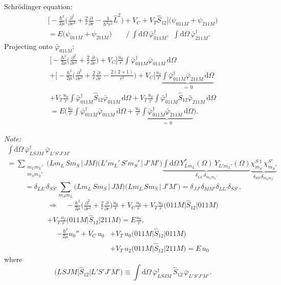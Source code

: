 \documentclass[11pt,a4paper]{article}
\newcommand{\op}[1]{\hat{#1}}
\newcommand{\ud}{\mathrm{d}}
\begin{document}
Schr\"odinger equation:
\begin{multline*}
\Big[-\frac{\hbar^2}{2\mu}\Big(\frac{\partial^2}{\partial r^2}+\frac2r\frac{\partial}{\partial r}
-\frac{1}{\hbar^2r^2}\op L^2\Big)+V_C+V_T\op S_{12}\Big]\big(\psi_{011M}+\psi_{211M}\big)\\
=E\big(\psi_{011M}+\psi_{211M}\big)
\qquad\Big/\ \int\!\ud\Omega\,\bar\varphi^\dagger_{011M},\ \ \int\!\ud\Omega\,\bar\varphi^\dagger_{211M}.
\end{multline*}
Projecting onto $\bar\varphi_{011M}$:
\begin{multline*}
\Big[-\frac{\hbar^2}{2\mu}\Big(\frac{\partial^2}{\partial r^2}+\frac2r\frac{\partial}{\partial r}\Big)+V_C\Big]
\frac{u_0}{r}\int\bar\varphi^\dagger_{011M}\bar\varphi_{011M}\,\ud\Omega\\
+\Big[-\frac{\hbar^2}{2\mu}\Big(\frac{\partial^2}{\partial r^2}+\frac2r\frac{\partial}{\partial r}
-\frac{2(2+1)}{r^2}\Big)+V_C\Big]\frac{u_2}{r}
\underbrace{\int\bar\varphi^\dagger_{011M}\bar\varphi_{211M}\,\ud\Omega}_{=\,0}\\
+V_T\frac{u_0}{r}\int\bar\varphi^\dagger_{011M}\op S_{12}\bar\varphi_{011M}\,\ud\Omega
+V_T\frac{u_2}{r}\int\bar\varphi^\dagger_{011M}\op S_{12}\bar\varphi_{211M}\,\ud\Omega\\
=E\Big(\frac{u_0}{r}\int\bar\varphi^\dagger_{011M}\bar\varphi_{011M}\,\ud\Omega
+\frac{u_2}{r}\underbrace{\int\bar\varphi^\dagger_{011M}\bar\varphi_{211M}\,\ud\Omega}_{=\,0}\Big).
\end{multline*}

\emph{Note:}
\begin{multline*}
\int\!\ud\Omega\,\bar\varphi^\dagger_{LSJM}\,\bar\varphi_{L'S'J'M'}\\
=\sum_{\substack{m_Lm_L'\\ m_Sm_S'}}\big(Lm_L\,Sm_S\,|\,JM\big)\big(L'm_L'\,S'm_S'\,|\,J'M'\big)
\underbrace{\int\!\ud\Omega\,Y^*_{Lm_L}(\Omega)\,Y_{L'm_L'}(\Omega)}_{\delta_{LL'}\delta_{m_Lm_L'}}
\underbrace{\chi^{S\dagger}_{m_S}\chi^{S'}_{m_S'}}_{\delta_{SS'}\delta_{m_Sm_S'}}
\end{multline*}
\[
=\delta_{LL'}\delta_{SS'}\sum_{m_Sm_L}\big(Lm_L\,Sm_S\,|\,JM\big)\big(Lm_L\,Sm_S\,|\,J'M'\big)
=\delta_{JJ'}\delta_{MM'}\delta_{LL'}\delta_{SS'} .
\]
\begin{multline*}
\Rightarrow\quad
-\frac{\hbar^2}{2\mu}\Big(\frac{\partial^2}{\partial r^2}+\frac2r\frac{\partial}{\partial r}\Big)\frac{u_0}{r}
+V_C\frac{u_0}{r}+V_T\frac{u_0}{r}\big(011M\big|\op S_{12}\big|011M\big)\\
+V_T\frac{u_2}{r}\big(011M\big|\op S_{12}\big|211M\big)=E\frac{u_0}{r},
\end{multline*}
\[
\boxed{
\begin{aligned}
-\frac{\hbar^2}{2\mu}u_0''+V_C\,u_0
&+V_T\,u_0\big(011M\big|\op S_{12}\big|011M\big)\\
&+V_T\,u_2\big(011M\big|\op S_{12}\big|211M\big)=E\,u_0
\end{aligned}
}
\]
where
\[
\big(LSJM\big|\op S_{12}\big|L'S'J'M'\big)\equiv\int\!\ud\Omega\,\bar\varphi^\dagger_{LSJM}\,\op S_{12}\,\bar\varphi_{L'S'J'M'} .
\]
\end{document}
